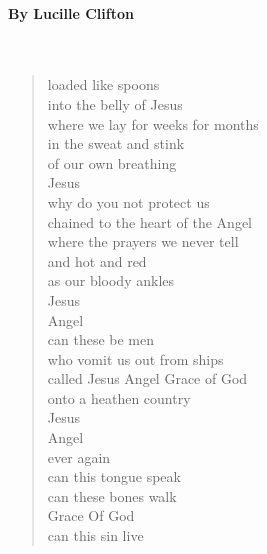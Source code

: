 \documentclass[12pt, openany, letterpaper]{memoir}
\begin{document}
\begin{description}
\paragraph{By Lucille Clifton}~
\begin{verse}
	loaded like spoons\\
	into the belly of Jesus\\
	where we lay for weeks for months\\
	in the sweat and stink\\
	of our own breathing\\
	Jesus\\
	why do you not protect us\\
	chained to the heart of the Angel\\
	where the prayers we never tell\\
	and hot and red\\
	as our bloody ankles\\
	Jesus\\
	Angel\\
	can these be men\\
	who vomit us out from ships\\
	called Jesus    Angel    Grace of God\\
	onto a heathen country\\
	Jesus\\
	Angel\\
	ever again\\
	can this tongue speak\\
	can these bones walk\\
	Grace Of God\\
	can this sin live
\end{verse}
\end{description}
\end{document}
